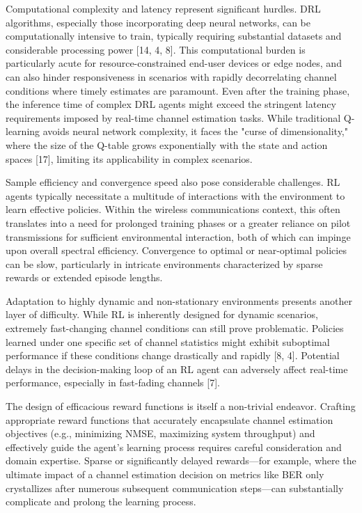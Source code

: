 \documentclass[journal,twocolumn]{IEEEtran}
\begin{document}
Computational complexity and latency represent significant hurdles. DRL algorithms, especially those incorporating deep neural networks, can be computationally intensive to train, typically requiring substantial datasets and considerable processing power [14, 4, 8]. This computational burden is particularly acute for resource-constrained end-user devices or edge nodes, and can also hinder responsiveness in scenarios with rapidly decorrelating channel conditions where timely estimates are paramount. Even after the training phase, the inference time of complex DRL agents might exceed the stringent latency requirements imposed by real-time channel estimation tasks. While traditional Q-learning avoids neural network complexity, it faces the "curse of dimensionality," where the size of the Q-table grows exponentially with the state and action spaces [17], limiting its applicability in complex scenarios.

Sample efficiency and convergence speed also pose considerable challenges. RL agents typically necessitate a multitude of interactions with the environment to learn effective policies. Within the wireless communications context, this often translates into a need for prolonged training phases or a greater reliance on pilot transmissions for sufficient environmental interaction, both of which can impinge upon overall spectral efficiency. Convergence to optimal or near-optimal policies can be slow, particularly in intricate environments characterized by sparse rewards or extended episode lengths.

Adaptation to highly dynamic and non-stationary environments presents another layer of difficulty. While RL is inherently designed for dynamic scenarios, extremely fast-changing channel conditions can still prove problematic. Policies learned under one specific set of channel statistics might exhibit suboptimal performance if these conditions change drastically and rapidly [8, 4]. Potential delays in the decision-making loop of an RL agent can adversely affect real-time performance, especially in fast-fading channels [7].

The design of efficacious reward functions is itself a non-trivial endeavor. Crafting appropriate reward functions that accurately encapsulate channel estimation objectives (e.g., minimizing NMSE, maximizing system throughput) and effectively guide the agent's learning process requires careful consideration and domain expertise. Sparse or significantly delayed rewards—for example, where the ultimate impact of a channel estimation decision on metrics like BER only crystallizes after numerous subsequent communication steps—can substantially complicate and prolong the learning process.
\end{document}
